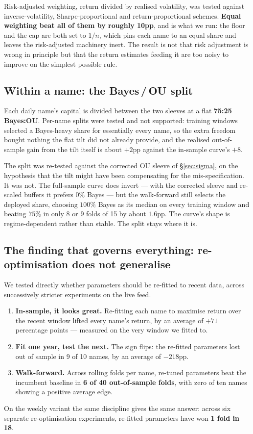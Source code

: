 \documentclass[11pt]{article}
\begin{document}
Risk-adjusted weighting, return divided by realised volatility, was tested against
inverse-volatility, Sharpe-proportional and return-proportional schemes. \textbf{Equal weighting
beat all of them by roughly 10pp}, and is what we run: the floor and the cap are both set to
$1/n$, which pins each name to an equal share and leaves the risk-adjusted machinery inert. The
result is not that risk adjustment is wrong in principle but that the return estimates feeding it
are too noisy to improve on the simplest possible rule.

\subsection{Within a name: the Bayes\,/\,OU split}
Each daily name's capital is divided between the two sleeves at a flat \textbf{75:25
Bayes:OU}. Per-name splits were tested and not supported: training windows selected a
Bayes-heavy share for essentially every name, so the extra freedom bought nothing the flat tilt
did not already provide, and the realised out-of-sample gain from the tilt itself is about
$+2$pp against the in-sample curve's $+8$.

The split was re-tested against the corrected OU sleeve of \S\ref{sec:sigma}, on the hypothesis
that the tilt might have been compensating for the mis-specification. It was not. The
full-sample curve does invert --- with the corrected sleeve and re-scaled buffers it prefers
$0\%$ Bayes --- but the walk-forward still selects the deployed share, choosing $100\%$ Bayes as
its median on every training window and beating $75\%$ in only 8 or 9 folds of 15 by about
$1.6$pp. The curve's shape is regime-dependent rather than stable. The split stays where it is.

\subsection{The finding that governs everything: re-optimisation does not generalise}
\label{sec:noreopt}
We tested directly whether parameters should be re-fitted to recent data, across successively
stricter experiments on the live feed.
\begin{enumerate}[topsep=2pt,itemsep=2pt]
\item \textbf{In-sample, it looks great.} Re-fitting each name to maximise return over the recent
      window lifted every name's return, by an average of $+71$ percentage points --- measured on
      the very window we fitted to.
\item \textbf{Fit one year, test the next.} The sign flips: the re-fitted parameters lost out of
      sample in 9 of 10 names, by an average of $-218$pp.
\item \textbf{Walk-forward.} Across rolling folds per name, re-tuned parameters beat the
      incumbent baseline in \textbf{6 of 40 out-of-sample folds}, with zero of ten names showing
      a positive average edge.
\end{enumerate}
On the weekly variant the same discipline gives the same answer: across six separate
re-optimisation experiments, re-fitted parameters have won \textbf{1 fold in 18}.
\end{document}
